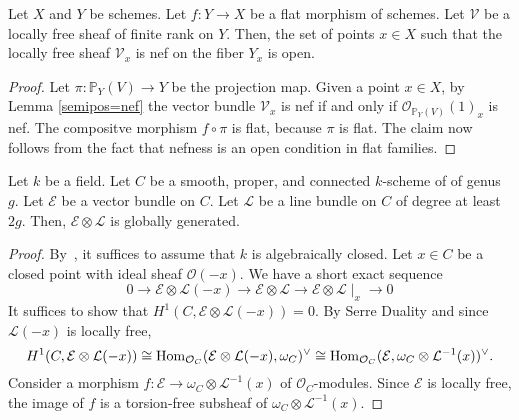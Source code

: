 \begin{lemma}\label{semipos_locus_open}
Let $X$ and $Y$ be schemes.
Let $f:Y\to X$ be a flat morphism of schemes.
Let $\mathcal{V}$ be a locally free sheaf of finite rank on $Y$.
Then, the set of points $x\in X$ such that the locally free sheaf
$\mathcal{V}_x$ is nef on the fiber $Y_x$ is open.
\end{lemma}

\begin{proof}
Let $\pi:\mathbb{P}_Y(V)\to Y$ be the projection map.
Given a point $x\in X$, by Lemma \ref{semipos=nef} the vector bundle
$\mathcal{V}_x$ is nef if and only if
$\mathcal{O}_{\mathbb{P}_Y(V)}(1)_x$ is nef.
The compositve morphism $f\circ \pi$ is flat, because $\pi$ is flat.
The claim now follows from the fact that nefness is an open condition in flat
families.
\end{proof}

\begin{lemma}\label{global_generation_of_twist_on_curve}
Let $k$ be a field.
Let $C$ be a smooth, proper, and connected $k$-scheme of of genus $g$.
Let $\mathcal{E}$ be a vector bundle on $C$.
Let $\mathcal{L}$ be a line bundle on $C$ of degree at least $2g$.
Then, $\mathcal{E}\otimes\mathcal{L}$ is globally generated.
\end{lemma}

\begin{proof}
By~, it suffices to assume that $k$ is algebraically closed.
Let $x\in C$ be a closed point with ideal sheaf $\mathcal{O}(-x)$.
We have a short exact sequence
\begin{equation}
  0 \to
  \mathcal{E} \otimes \mathcal{L}(-x) \to
  \mathcal{E} \otimes \mathcal{L} \to
  \mathcal{E} \otimes \mathcal{L}\mid_x \to
  0
\end{equation}
It suffices to show that $H^1(C,\mathcal{E}\otimes\mathcal{L}(-x)) = 0$.
By Serre Duality and
since $\mathcal{L}(-x)$ is locally free,
$$
H^1(C,\mathcal{E}\otimes\mathcal{L}(-x)) \cong
  \mathop{\rm Hom}\nolimits_{\mathcal{O}_C}(\mathcal{E} \otimes \mathcal{L}(-x),\omega_C)^\vee \cong
  \mathop{\rm Hom}\nolimits_{\mathcal{O}_C}(\mathcal{E},\omega_C\otimes\mathcal{L}^{-1}(x))^\vee.
$$
Consider a morphism $f : \mathcal{E} \to \omega_C \otimes \mathcal{L}^{-1}(x)$
of $\mathcal{O}_C$-modules.
Since $\mathcal{E}$ is locally free, the image of $f$ is a torsion-free
subsheaf of $\omega_C \otimes \mathcal{L}^{-1}(x)$.
\end{proof}


